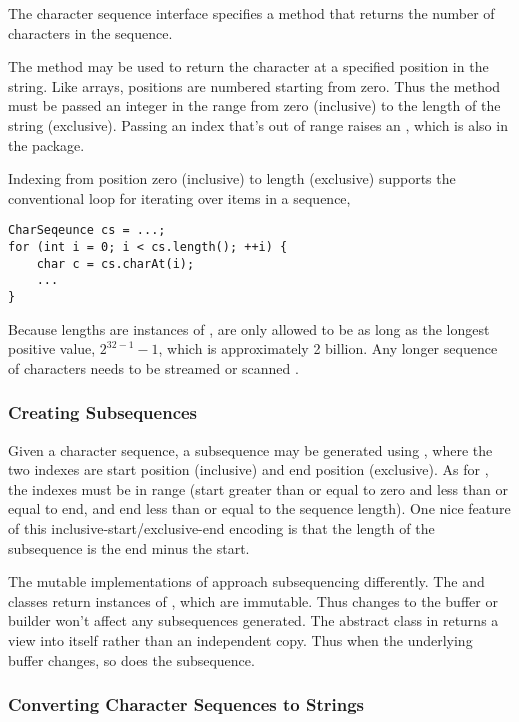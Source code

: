 The character sequence interface specifies a method 
that returns the number of characters in the sequence.  

The method  may be used to return the character at a
specified position in the string.  Like arrays, positions are numbered
starting from zero.  Thus the method must be passed an integer in the
range from zero (inclusive) to the length of the string (exclusive).
Passing an index that's out of range raises an
, which is also in the
 package.

Indexing from position zero (inclusive) to length (exclusive) supports
the conventional  loop for iterating over items in a sequence,
%
\begin{verbatim}
CharSeqeunce cs = ...;
for (int i = 0; i < cs.length(); ++i) {
    char c = cs.charAt(i);
    ...
}
\end{verbatim}
%
Because lengths are instances of , are only allowed to be as
long as the longest positive  value, $2^{32-1} - 1$, which
is approximately 2 billion.  Any longer sequence of characters needs
to be streamed  or scanned
.

\subsubsection{Creating Subsequences}

Given a character sequence, a subsequence may be generated using
, where the two indexes are start position
(inclusive) and end position (exclusive).  As for , the
indexes must be in range (start greater than or equal to zero and less
than or equal to end, and end less than or equal to the sequence
length). One nice feature of this inclusive-start/exclusive-end
encoding is that the length of the subsequence is the end minus the
start.  

The mutable implementations of  approach
subsequencing differently.  The  and
 classes return instances of , which
are immutable.  Thus changes to the buffer or builder won't affect any
subsequences generated.  The  abstract class in
 returns a view into itself rather than an independent
copy.  Thus when the underlying buffer changes, so does the
subsequence.

\subsubsection{Converting Character Sequences to Strings}

